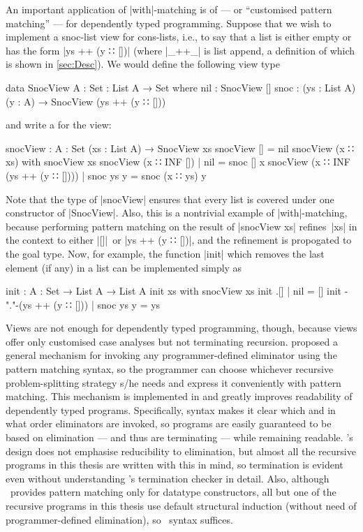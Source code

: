 An important application of |with|-matching is  of  --- or ``customised pattern matching'' --- for dependently typed programming.
Suppose that we wish to implement a snoc-list view for cons-lists, i.e., to say that a list is either empty or has the form |ys ++ (y ∷ [])| (where |_++_| is list append, a definition of which is shown in \autoref{sec:Desc}).
We would define the following view type
\begin{code}
data SnocView {A : Set} : List A → Set where
  nil   : SnocView []
  snoc  : (ys : List A) (y : A) → SnocView (ys ++ (y ∷ []))
\end{code}
and write a  for the view:
\begin{code}
snocView : {A : Set} (xs : List A) → SnocView xs
snocView [] = nil
snocView (x ∷ xs)                    with snocView xs
snocView (x ∷ INF [])                | nil        = snoc [] x
snocView (x ∷ INF (ys ++ (y ∷ [])))  | snoc ys y  = snoc (x ∷ ys) y
\end{code}
Note that the type of |snocView| ensures that every list is covered under one constructor of |SnocView|.
Also, this is a nontrivial example of |with|-matching, because performing pattern matching on the result of |snocView xs| refines~|xs| in the context to either |[]|~or |ys ++ (y ∷ [])|, and the refinement is propogated to the goal type.
Now, for example, the function |init| which removes the last element (if any) in a list can be implemented simply as
\begin{code}
init : {A : Set} → List A → List A
init xs                       with snocView xs
init .[]                      | nil        = []
init {-"."-}(ys ++ (y ∷ []))  | snoc ys y  = ys
\end{code}

Views are not enough for dependently typed programming, though, because views offer only customised case analyses but not terminating recursion.
\citet{McBride-view} proposed a general mechanism for invoking any programmer-defined eliminator using the pattern matching syntax, so the programmer can choose whichever recursive problem-splitting strategy s/he needs and express it conveniently with pattern matching.
This mechanism is implemented in  and greatly improves readability of dependently typed programs.
Specifically,  syntax makes it clear which and in what order eliminators are invoked, so programs are easily guaranteed to be based on elimination --- and thus are terminating --- while remaining readable.
\Agda's design does not emphasise reducibility to elimination, but almost all the recursive programs in this thesis are written with this in mind, so termination is evident even without understanding \Agda's termination checker in detail.
Also, although \Agda\ provides pattern matching only for datatype constructors, all but one of the recursive programs in this thesis use default structural induction (without need of programmer-defined elimination), so \Agda\ syntax suffices.


